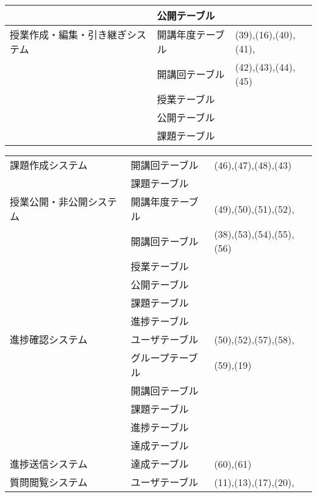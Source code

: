 \begin{table}[H]
\begin{tabular}{|l|l|l|}
                        　& 公開テーブル & \\ \hline
    授業作成・編集・引き継ぎシステム & 開講年度テーブル & (39),(16),(40),(41),\\ \cline{2-2}
                                & 開講回テーブル & (42),(43),(44),(45)\\ \cline{2-2}
                                & 授業テーブル & \\ \cline{2-2}
                                & 公開テーブル & \\ \cline{2-2}
                                & 課題テーブル & \\ \hline
															\end{tabular}
														\end{table}
\newpage
														\begin{table}[H]
																\centering
																\begin{tabular}{|l|l|l|}
																\hline
    課題作成システム & 開講回テーブル & (46),(47),(48),(43)\\ \cline{2-2}
                  & 課題テーブル & \\ \hline
    授業公開・非公開システム & 開講年度テーブル & (49),(50),(51),(52),\\ \cline{2-2}
                        & 開講回テーブル & (38),(53),(54),(55),(56)\\ \cline{2-2}
                        & 授業テーブル & \\ \cline{2-2}
                        & 公開テーブル & \\ \cline{2-2}
                        & 課題テーブル & \\ \cline{2-2}
                        & 進捗テーブル & \\ \hline
    進捗確認システム & ユーザテーブル & (50),(52),(57),(58),\\ \cline{2-2}
                  & グループテーブル & (59),(19)\\ \cline{2-2}
                  & 開講回テーブル & \\ \cline{2-2}
                  & 課題テーブル & \\ \cline{2-2}
                  & 進捗テーブル & \\ \cline{2-2}
                  & 達成テーブル & \\ \hline
    進捗送信システム & 達成テーブル & (60),(61)\\ \hline
    質問閲覧システム & ユーザテーブル & (11),(13),(17),(20),\\ \cline{2-2}

\end{tabular}
\end{table}
